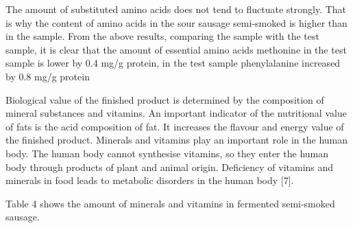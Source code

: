 \begin{multicols}{2}
The amount of substituted amino acids does not tend to fluctuate
strongly. That is why the content of amino acids in the sour sausage
semi-smoked is higher than in the sample. From the above results,
comparing the sample with the test sample, it is clear that the amount
of essential amino acids methonine in the test sample is lower by 0.4
mg/g protein, in the test sample phenylalanine increased by 0.8 mg/g
protein

Biological value of the finished product is determined by the
composition of mineral substances and vitamins. An important indicator
of the nutritional value of fats is the acid composition of fat. It
increases the flavour and energy value of the finished product. Minerals
and vitamins play an important role in the human body. The human body
cannot synthesise vitamins, so they enter the human body through
products of plant and animal origin. Deficiency of vitamins and minerals
in food leads to metabolic disorders in the human body {[}7{]}.

Table 4 shows the amount of minerals and vitamins in fermented
semi-smoked sausage.
\end{multicols}

